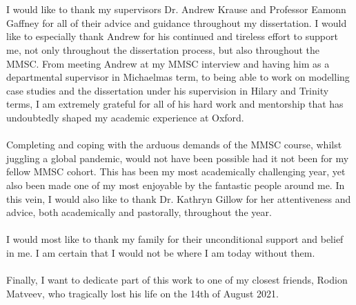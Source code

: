 \section*{}


I would like to thank my supervisors Dr. Andrew Krause and Professor Eamonn Gaffney for all of their advice and guidance throughout my dissertation. I would like to especially thank Andrew for his continued and tireless effort to support me, not only throughout the dissertation process, but also throughout the MMSC. From meeting Andrew at my MMSC interview and having him as a departmental supervisor in Michaelmas term, to being able to work on modelling case studies and the dissertation under his supervision in Hilary and Trinity terms, I am extremely grateful for all of his hard work and mentorship that has undoubtedly shaped my academic experience at Oxford.\\\\
Completing and coping with the arduous demands of the MMSC course, whilst juggling a global pandemic, would not have been possible had it not been for my fellow MMSC cohort. This has been my most academically challenging year, yet also been made one of my most enjoyable by the fantastic people around me. In this vein, I would also like to thank Dr. Kathryn Gillow for her attentiveness and advice, both academically and pastorally, throughout the year.\\\\
I would most like to thank my family for their unconditional support and belief in me. I am certain that I would not be where I am today without them.\\\\
Finally, I want to dedicate part of this work to one of my closest friends, Rodion Matveev, who tragically lost his life on the 14th of August 2021.
